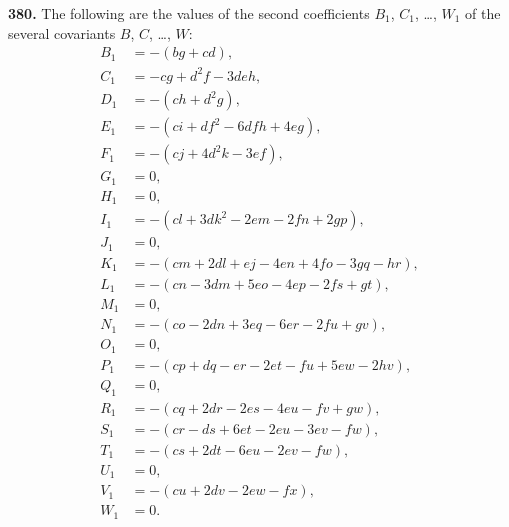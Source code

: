 \documentclass[11pt,a4paper]{book}
\begin{document}
\noindent\textbf{380.} The following are the values of the second coefficients $B_1$, $C_1$, \ldots, $W_1$ of the several covariants $B$, $C$, \ldots, $W$:
\begin{align*}
B_1 &= -(bg + cd), \\
C_1 &= -cg + d^2 f - 3deh, \\
D_1 &= -(ch + d^2 g), \\
E_1 &= -(ci + df^2 - 6dfh + 4eg), \\
F_1 &= -(cj + 4d^2 k - 3ef), \\
G_1 &= 0, \\
H_1 &= 0, \\
I_1 &= -(cl + 3dk^2 - 2em - 2fn + 2gp), \\
J_1 &= 0, \\
K_1 &= -(cm + 2dl + ej - 4en + 4fo - 3gq - hr), \\
L_1 &= -(cn - 3dm + 5eo - 4ep - 2fs + gt), \\
M_1 &= 0, \\
N_1 &= -(co - 2dn + 3eq - 6er - 2fu + gv), \\
O_1 &= 0, \\
P_1 &= -(cp + dq - er - 2et - fu + 5ew - 2hv), \\
Q_1 &= 0, \\
R_1 &= -(cq + 2dr - 2es - 4eu - fv + gw), \\
S_1 &= -(cr - ds + 6et - 2eu - 3ev - fw), \\
T_1 &= -(cs + 2dt - 6eu - 2ev - fw), \\
U_1 &= 0, \\
V_1 &= -(cu + 2dv - 2ew - fx), \\
W_1 &= 0.
\end{align*}

\medskip
\end{document}
